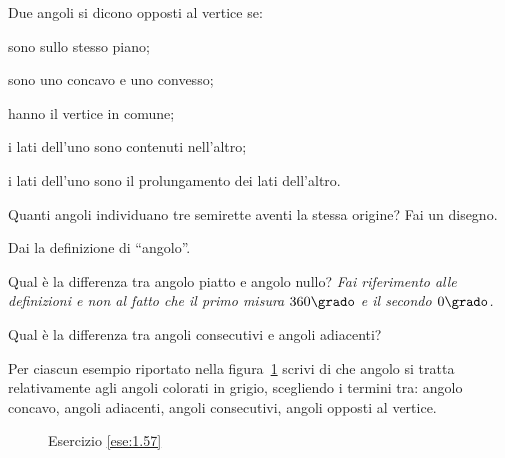 \pagebreak

\begin{esercizio}
\label{ese:1.52}
Due angoli si dicono opposti al vertice se:
\begin{enumeratea}
\item sono sullo stesso piano;
\item sono uno concavo e uno convesso;
\item hanno il vertice in comune;
\item i lati dell'uno sono contenuti nell'altro;
\item i lati dell'uno sono il prolungamento dei lati dell'altro.
\end{enumeratea}
\end{esercizio}

\begin{esercizio}
\label{ese:1.53}
Quanti angoli individuano tre semirette aventi la stessa origine? Fai 
un disegno.
\end{esercizio}

\begin{esercizio}
\label{ese:1.54}
Dai la definizione di ``angolo''.
\end{esercizio}

\begin{esercizio}
\label{ese:1.55}
Qual è la differenza tra angolo piatto e angolo nullo? \emph{Fai 
riferimento alle definizioni e non al fatto che il primo misura 
$360\grado$ e il secondo $0\grado$.}
\end{esercizio}

\begin{esercizio}
\label{ese:1.56}
Qual è la differenza tra angoli consecutivi e angoli adiacenti?
\end{esercizio}

\begin{esercizio}
\label{ese:1.57}
Per ciascun esempio riportato nella figura~\ref{fig:ese1.57} scrivi 
di che angolo si tratta relativamente agli angoli colorati in grigio, 
scegliendo i termini tra: angolo concavo, angoli adiacenti, angoli 
consecutivi, angoli opposti al vertice.
\end{esercizio}


\begin{inaccessibleblock}
 \begin{figure}[htb]
 \centering
 \caption{Esercizio \ref{ese:1.57}}\label{fig:ese1.57}
\end{figure}
\end{inaccessibleblock}

